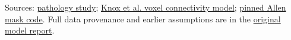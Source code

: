 \documentclass[10pt]{article}
\begin{document}
\small
Sources: \href{https://doi.org/10.1101/2024.10.22.619411}{pathology study}; \href{https://doi.org/10.1162/netn_a_00066}{Knox et al. voxel connectivity model}; \href{https://github.com/AllenInstitute/mouse_connectivity_models/blob/7637e405d7d97bea4b82758c18e825651f4a7815/mcmodels/core/masks.py}{pinned Allen mask code}. Full data provenance and earlier assumptions are in the \href{https://github.com/gretarsson/pixel-sis/blob/main/docs/report/pixel_sis_report.pdf}{original model report}.
\end{document}
